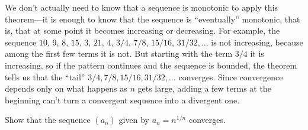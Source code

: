 \documentclass{ximera}
\begin{document}

We don't actually need to know that a sequence is monotonic to apply
this theorem---it is enough to know that the sequence is
``eventually'' monotonic,
that is, that at some point it becomes increasing or decreasing.  For
example, the sequence $10$, $9$, $8$, $15$, $3$, $21$, $4$, $3/4$,
$7/8$, $15/16$, $31/32,\ldots$ is not increasing, because among the
first few terms it is not. But starting with the term $3/4$ it is
increasing, so if the pattern continues and the sequence is bounded,
the theorem tells us that the ``tail'' $3/4, 7/8, 15/16, 31/32,\ldots$
converges.  Since convergence depends only on what happens as $n$ gets
large, adding a few terms at the beginning can't turn a convergent
sequence into a divergent one.

\begin{example}
\label{example:nth-root-of-n}
Show that the sequence $(a_n)$ given by $a_n = n^{1/n}$ converges.
\end{example}

\end{document}
